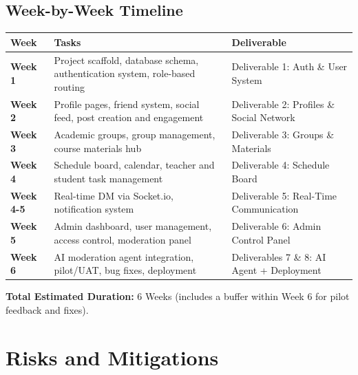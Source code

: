 \documentclass[11pt,a4paper]{article}
\begin{document}
\subsection{Week-by-Week Timeline}
\begin{longtable}{>{\bfseries}p{2cm} p{5.5cm} p{5.5cm}}
\toprule
Week & Tasks & Deliverable \\
\midrule
\endhead
Week 1 & Project scaffold, database schema, authentication system, role-based routing & Deliverable 1: Auth \& User System \\[6pt]
Week 2 & Profile pages, friend system, social feed, post creation and engagement & Deliverable 2: Profiles \& Social Network \\[6pt]
Week 3 & Academic groups, group management, course materials hub & Deliverable 3: Groups \& Materials \\[6pt]
Week 4 & Schedule board, calendar, teacher and student task management & Deliverable 4: Schedule Board \\[6pt]
Week 4-5 & Real-time DM via Socket.io, notification system & Deliverable 5: Real-Time Communication \\[6pt]
Week 5 & Admin dashboard, user management, access control, moderation panel & Deliverable 6: Admin Control Panel \\[6pt]
Week 6 & AI moderation agent integration, pilot/UAT, bug fixes, deployment & Deliverables 7 \& 8: AI Agent + Deployment \\
\bottomrule
\end{longtable}
\textbf{Total Estimated Duration:} 6 Weeks (includes a buffer within Week 6 for pilot feedback and fixes).

\section{Risks and Mitigations}
\end{document}
